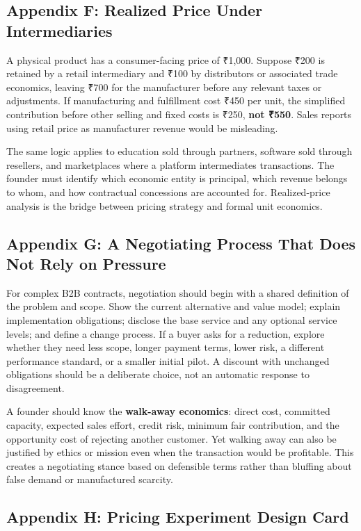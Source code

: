 \subsection*{Appendix F: Realized Price Under Intermediaries}

A physical product has a consumer-facing price of ₹1,000. Suppose ₹200 is retained by a retail intermediary and ₹100 by distributors or associated trade economics, leaving ₹700 for the manufacturer before any relevant taxes or adjustments. If manufacturing and fulfillment cost ₹450 per unit, the simplified contribution before other selling and fixed costs is ₹250, \textbf{not ₹550}. Sales reports using retail price as manufacturer revenue would be misleading.

The same logic applies to education sold through partners, software sold through resellers, and marketplaces where a platform intermediates transactions. The founder must identify which economic entity is principal, which revenue belongs to whom, and how contractual concessions are accounted for. Realized-price analysis is the bridge between pricing strategy and formal unit economics.

\subsection*{Appendix G: A Negotiating Process That Does Not Rely on Pressure}

For complex B2B contracts, negotiation should begin with a shared definition of the problem and scope. Show the current alternative and value model; explain implementation obligations; disclose the base service and any optional service levels; and define a change process. If a buyer asks for a reduction, explore whether they need less scope, longer payment terms, lower risk, a different performance standard, or a smaller initial pilot. A discount with unchanged obligations should be a deliberate choice, not an automatic response to disagreement.

A founder should know the \textbf{walk-away economics}: direct cost, committed capacity, expected sales effort, credit risk, minimum fair contribution, and the opportunity cost of rejecting another customer. Yet walking away can also be justified by ethics or mission even when the transaction would be profitable. This creates a negotiating stance based on defensible terms rather than bluffing about false demand or manufactured scarcity.

\subsection*{Appendix H: Pricing Experiment Design Card}

